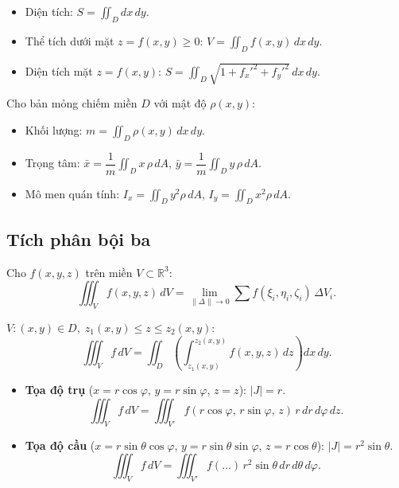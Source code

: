 \documentclass[12pt,a4paper]{article}
\begin{document}
\begin{congthuc}[title={Ứng dụng hình học}]
  \begin{itemize}
    \item Diện tích: $S = \displaystyle\iint_D dx\,dy$.
    \item Thể tích dưới mặt $z = f(x,y) \ge 0$: $V = \displaystyle\iint_D f(x,y)\,dx\,dy$.
    \item Diện tích mặt $z = f(x,y)$: $S = \displaystyle\iint_D \sqrt{1 + f_x'^2 + f_y'^2}\,dx\,dy$.
  \end{itemize}
\end{congthuc}

\begin{congthuc}[title={Ứng dụng cơ học}]
  Cho bản mỏng chiếm miền $D$ với mật độ $\rho(x,y)$:
  \begin{itemize}
    \item Khối lượng: $m = \displaystyle\iint_D \rho(x,y)\,dx\,dy$.
    \item Trọng tâm: $\bar{x} = \dfrac{1}{m}\displaystyle\iint_D x\,\rho\,dA$, \;$\bar{y} = \dfrac{1}{m}\displaystyle\iint_D y\,\rho\,dA$.
    \item Mô men quán tính: $I_x = \displaystyle\iint_D y^2 \rho\,dA$, \;$I_y = \displaystyle\iint_D x^2 \rho\,dA$.
  \end{itemize}
\end{congthuc}

\subsection{Tích phân bội ba}

\begin{dinhnghia}
  Cho $f(x,y,z)$ trên miền $V \subset \mathbb{R}^3$:
  \[
    \iiint_V f(x,y,z)\,dV = \lim_{\|\Delta\| \to 0} \sum f(\xi_i, \eta_i, \zeta_i)\,\Delta V_i.
  \]
\end{dinhnghia}

\begin{congthuc}[title={Tính trong hệ tọa độ Descartes}]
  $V: (x,y) \in D,\; z_1(x,y) \le z \le z_2(x,y)$:
  \[
    \iiint_V f\,dV = \iint_D\!\left(\int_{z_1(x,y)}^{z_2(x,y)} f(x,y,z)\,dz\right)dx\,dy.
  \]
\end{congthuc}

\begin{congthuc}[title={Đổi biến}]
  \begin{itemize}
    \item \textbf{Tọa độ trụ} ($x = r\cos\varphi$, $y = r\sin\varphi$, $z = z$): $|J| = r$.
      \[
        \iiint_V f\,dV = \iiint_{V'} f(r\cos\varphi,\, r\sin\varphi,\, z)\,r\,dr\,d\varphi\,dz.
      \]
    \item \textbf{Tọa độ cầu} ($x = r\sin\theta\cos\varphi$, $y = r\sin\theta\sin\varphi$, $z = r\cos\theta$): $|J| = r^2\sin\theta$.
      \[
        \iiint_V f\,dV = \iiint_{V'} f(\ldots)\,r^2\sin\theta\,dr\,d\theta\,d\varphi.
      \]
  \end{itemize}
\end{congthuc}
\end{document}
